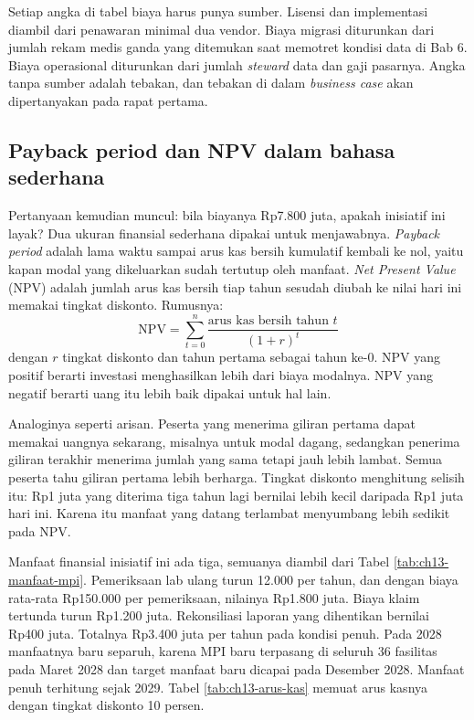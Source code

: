 Setiap angka di tabel biaya harus punya sumber. Lisensi dan implementasi
diambil dari penawaran minimal dua vendor. Biaya migrasi diturunkan dari
jumlah rekam medis ganda yang ditemukan saat memotret kondisi data di Bab 6.
Biaya operasional diturunkan dari jumlah \textit{steward} data dan gaji
pasarnya. Angka tanpa sumber adalah tebakan, dan tebakan di dalam
\textit{business case} akan dipertanyakan pada rapat pertama.

\subsection*{Payback period dan NPV dalam bahasa sederhana}

Pertanyaan kemudian muncul: bila biayanya Rp7.800 juta, apakah inisiatif ini
layak? Dua ukuran finansial sederhana dipakai untuk menjawabnya.
\textit{Payback period} adalah lama waktu sampai arus kas bersih kumulatif
kembali ke nol, yaitu kapan modal yang dikeluarkan sudah tertutup oleh
manfaat. \textit{Net Present Value} (NPV) adalah jumlah arus kas bersih tiap
tahun sesudah diubah ke nilai hari ini memakai tingkat diskonto. Rumusnya:
\[
  \mathrm{NPV} = \sum_{t=0}^{n} \frac{\text{arus kas bersih tahun } t}{(1+r)^{t}}
\]
dengan $r$ tingkat diskonto dan tahun pertama sebagai tahun ke-0. NPV yang
positif berarti investasi menghasilkan lebih dari biaya modalnya. NPV yang
negatif berarti uang itu lebih baik dipakai untuk hal lain.

Analoginya seperti arisan. Peserta yang menerima giliran pertama dapat
memakai uangnya sekarang, misalnya untuk modal dagang, sedangkan penerima
giliran terakhir menerima jumlah yang sama tetapi jauh lebih lambat. Semua
peserta tahu giliran pertama lebih berharga. Tingkat diskonto menghitung
selisih itu: Rp1 juta yang diterima tiga tahun lagi bernilai lebih kecil
daripada Rp1 juta hari ini. Karena itu manfaat yang datang terlambat
menyumbang lebih sedikit pada NPV.

Manfaat finansial inisiatif ini ada tiga, semuanya diambil dari Tabel
\ref{tab:ch13-manfaat-mpi}. Pemeriksaan lab ulang turun 12.000 per tahun,
dan dengan biaya rata-rata Rp150.000 per pemeriksaan, nilainya Rp1.800 juta.
Biaya klaim tertunda turun Rp1.200 juta. Rekonsiliasi laporan yang dihentikan
bernilai Rp400 juta. Totalnya Rp3.400 juta per tahun pada kondisi penuh. Pada
2028 manfaatnya baru separuh, karena MPI baru terpasang di seluruh 36 fasilitas
pada Maret 2028 dan target manfaat baru dicapai pada Desember 2028. Manfaat penuh
terhitung sejak 2029. Tabel \ref{tab:ch13-arus-kas} memuat arus kasnya dengan
tingkat diskonto 10 persen.

